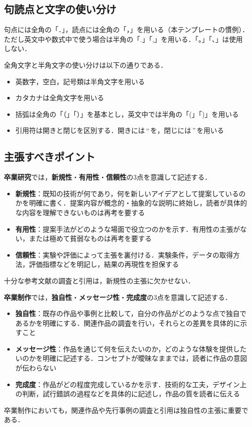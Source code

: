 \subsection{句読点と文字の使い分け}
\label{subsec:punctuation}
句点には全角の「．」，読点には全角の「，」を用いる（本テンプレートの慣例）．
ただし英文中や数式中で使う場合は半角の「.」「,」を用いる．「。」「、」は使用しない．

全角文字と半角文字の使い分けは以下の通りである．
\begin{itemize}
    \item 英数字，空白，記号類は半角文字を用いる
    \item カタカナは全角文字を用いる
    \item 括弧は全角の「（」「）」を基本とし，英文中では半角の「(」「)」を用いる
    \item 引用符は開きと閉じを区別する．開きには\,``\,を，閉じには\,''\,を用いる
\end{itemize}

\subsection{主張すべきポイント}
\label{subsec:novelty}

\textbf{卒業研究}では，\textbf{新規性}・\textbf{有用性}・\textbf{信頼性}の3点を意識して記述する．
\begin{itemize}
    \item \textbf{新規性}：既知の技術が何であり，何を新しいアイデアとして提案しているのかを明確に書く．提案内容が概念的・抽象的な説明に終始し，読者が具体的な内容を理解できないものは再考を要する
    \item \textbf{有用性}：提案手法がどのような場面で役立つのかを示す．有用性の主張がない，または極めて貧弱なものは再考を要する
    \item \textbf{信頼性}：実験や評価によって主張を裏付ける．実験条件，データの取得方法，評価指標などを明記し，結果の再現性を担保する
\end{itemize}
十分な参考文献の調査と引用は，新規性の主張に欠かせない．

\textbf{卒業制作}では，\textbf{独自性}・\textbf{メッセージ性}・\textbf{完成度}の3点を意識して記述する．
\begin{itemize}
    \item \textbf{独自性}：既存の作品や事例と比較して，自分の作品がどのような点で独自であるかを明確にする．関連作品の調査を行い，それらとの差異を具体的に示すこと
    \item \textbf{メッセージ性}：作品を通じて何を伝えたいのか，どのような体験を提供したいのかを明確に記述する．コンセプトが曖昧なままでは，読者に作品の意図が伝わらない
    \item \textbf{完成度}：作品がどの程度完成しているかを示す．技術的な工夫，デザイン上の判断，試行錯誤の過程などを具体的に記述し，作品の質を読者に伝える
\end{itemize}
卒業制作においても，関連作品や先行事例の調査と引用は独自性の主張に重要である．

